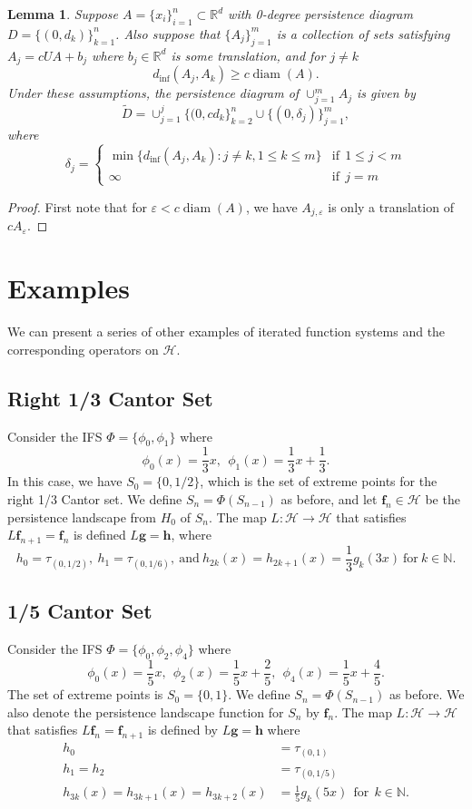 \documentclass [52pt] {article}
\newcommand{\R}{\mathbb{R}}
\newcommand{\N}{\mathbb{N}}
\newcommand{\Hil}{\mathcal{H}}
\DeclareMathOperator{\diam}{diam}
\newtheorem{lemma}{Lemma}
\begin{document}
\begin{lemma}
Suppose $A = \{x_i\}_{i=1}^n\subset\R^d$ with 0-degree persistence diagram $D = \{(0,d_k)\}_{k=1}^n$.  Also suppose that $\{A_j\}_{j=1}^m$ is a collection of sets satisfying $A_j = cUA + b_j$ where $b_j\in\R^d$ is some translation, and for $j\not=k$
\[d_{\inf}(A_j,A_k)\ge c\diam(A).\]
Under these assumptions, the persistence diagram of $\cup_{j=1}^mA_j$ is given by
\[\tilde{D} = \cup_{j=1}^j\{(0,cd_k\}_{k=2}^n \cup\{(0,\delta_j)\}_{j=1}^m,\]
where 
\[\delta_j = 
\begin{cases}
\min\{ d_{\inf}(A_j,A_k):j\not = k, 1\le k\le m\}  &\mathrm{if}\:\: 1\le j<m\\
\infty   &\mathrm{if}\:\: j=m
\end{cases}\]

\end{lemma}

\begin{proof}
First note that for $\varepsilon<c\diam(A)$, we have $A_{j,\varepsilon}$ is only a translation of $cA_\varepsilon$.  
\end{proof}


\section{Examples}
We can present a series of other examples of iterated function systems and the corresponding operators on $\mathcal{H}$. 
\subsection{Right 1/3 Cantor Set}
Consider the IFS $\Phi = \{\phi_0,\phi_1\}$ where
\[\phi_0(x) = \frac{1}{3}x,\:\:\phi_1(x) = \frac{1}{3}x+\frac{1}{3}.\]
In this case, we have $S_0 = \{0,1/2\}$, which is the set of extreme points for the right 1/3 Cantor set.  We define $S_n = \Phi(S_{n-1})$ as before, and let $\mathbf{f}_n\in\Hil$ be the persistence landscape from $H_0$ of $S_n$.  The map $L:\Hil\to\Hil$ that satisfies $L\mathbf{f}_{n+1} = \mathbf{f}_n$ is defined $L\mathbf{g} = \mathbf{h}$, where
\[h_0= \tau_{(0,1/2)},\: h_1 = \tau_{(0,1/6)},\:\text{and}\: h_{2k}(x) = h_{2k+1}(x) = \frac{1}{3}g_k(3x)\:\text{for}\: k\in\N.\]

\subsection{1/5 Cantor Set}
Consider the IFS $\Phi = \{\phi_0,\phi_2,\phi_4\}$ where
\[\phi_0(x) = \frac{1}{5}x,\:\:\phi_2(x) = \frac{1}{5}x+\frac{2}{5},\:\:\phi_4(x) = \frac{1}{5}x+\frac{4}{5}.\]
The set of extreme points is $S_0 = \{0,1\}$.  We define $S_n = \Phi(S_{n-1})$ as before.  We also denote the persistence landscape function for $S_n$ by $\mathbf{f}_n$.  The map $L:\Hil\to\Hil$ that satisfies $L\mathbf{f}_n = \mathbf{f}_{n+1}$ is defined by $L\mathbf{g} = \mathbf{h}$ where
\[\begin{split}
h_0 &= \tau_{(0,1)}\\
h_1 = h_2 &= \tau_{(0,1/5)}\\
h_{3k}(x) = h_{3k+1}(x) = h_{3k+2}(x) &= \frac{1}{5}g_k(5x)\:\:\text{for}\:\:k\in\mathbb{N}.
\end{split}\]
\end{document}
